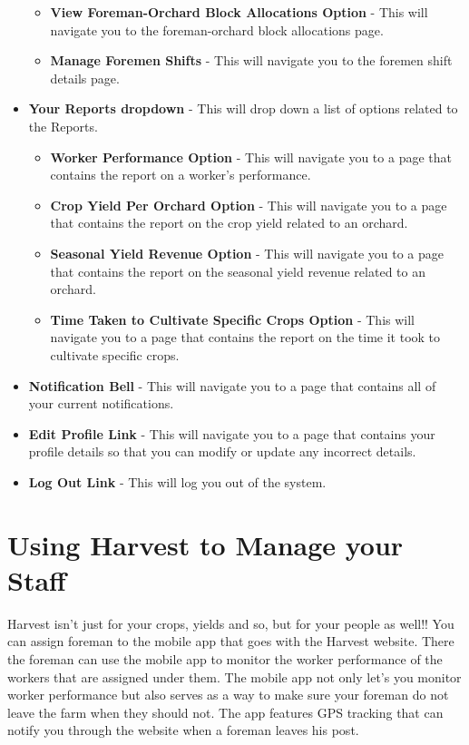 \documentclass[11pt,fleqn]{book} %
\begin{document}
\begin{itemize}
\begin{itemize}
				\item \textbf{View Foreman-Orchard Block Allocations Option} - This will navigate you to the foreman-orchard block allocations page.
				\item \textbf{Manage Foremen Shifts} - This will navigate you to the foremen shift details page.
			\end{itemize}
			\item \textbf{Your Reports dropdown} - This will drop down a list of options related to the Reports.
			\begin{itemize}
				\item \textbf{Worker Performance Option} - This will navigate you to a page that contains the report on a worker's performance.
				\item \textbf{Crop Yield Per Orchard Option} - This will navigate you to a page that contains the report on the crop yield related to an orchard.
				\item \textbf{Seasonal Yield Revenue Option} - This will navigate you to a page that contains the report on the seasonal yield revenue related to an orchard.
				\item \textbf{Time Taken to Cultivate Specific Crops Option} - This will navigate you to a page that contains the report on the time it took to cultivate specific crops.	
			\end{itemize}
			\item \textbf{Notification Bell} - This will navigate you to a page that contains all of your current notifications.
			\item \textbf{Edit Profile Link} - This will navigate you to a page that contains your profile details so that you can modify or update any incorrect details.
			\item \textbf{Log Out Link} - This will log you out of the system.
		\end{itemize}
	\section{Using Harvest to Manage your Staff}
		Harvest isn't just for your crops, yields and so, but for your people as well!! You can assign foreman to the mobile app that goes with the Harvest website. There the foreman can use the mobile app to monitor the worker performance of the workers that are assigned under them. The mobile app not only let's you monitor worker performance but also serves as a way to make sure your foreman do not leave the farm when they should not. The app features GPS tracking that can notify you through the website when a foreman leaves his post.
		
\end{document}
